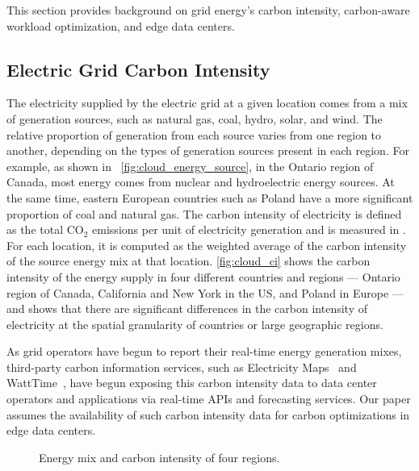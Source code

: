 This section provides background on grid energy's carbon intensity, carbon-aware workload optimization, and edge data centers. 

\subsection{Electric Grid Carbon Intensity}

The electricity supplied by the electric grid at a given location comes from a mix of generation sources, such as natural gas, coal, hydro, solar, and wind. The relative proportion of generation from each source varies from one region to another, depending on the types of generation sources present in each region. For example, as shown in ~\autoref{fig:cloud_energy_source}, in the Ontario region of Canada, most energy comes from nuclear and hydroelectric energy sources. At the same time, eastern European countries such as Poland have a more significant proportion of coal and natural gas. The carbon intensity of electricity is defined as the total $\text{CO}_2$ emissions per unit of electricity generation and is measured in \carbonunit. For each location, it is computed as the weighted average of the carbon intensity of the source energy mix at that location. \autoref{fig:cloud_ci} shows the carbon intensity of the energy supply in four different countries and regions ---  Ontario region of Canada, California and New York in the US, and Poland in Europe --- and shows that there are significant differences in the carbon intensity of electricity at the spatial granularity of countries or large geographic regions. 

As grid operators have begun to report their real-time energy generation mixes, third-party carbon information services, such as Electricity Maps~\cite{electricity-map} and WattTime~\cite{watttime}, have begun exposing this carbon intensity data to data center operators and applications via real-time APIs and forecasting services. Our paper assumes the availability of such carbon intensity data for carbon optimizations in edge data centers. 




\begin{figure}[t]
    \centering
    \quad
    \caption{Energy mix and carbon intensity of four regions.}
    \label{fig:cloud_example}
\end{figure}



